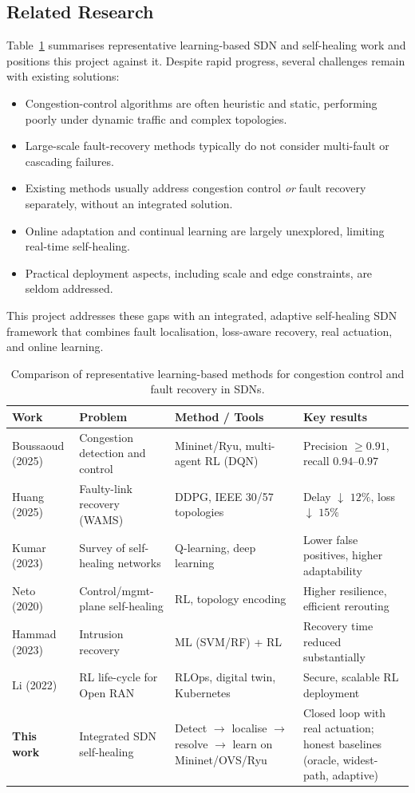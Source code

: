 \documentclass[12pt,a4paper]{report}
\begin{document}
\subsection{Related Research}
Table~\ref{tab:related} summarises representative learning-based SDN and self-healing work
and positions this project against it. Despite rapid progress, several challenges remain
with existing solutions:
\begin{itemize}
\item Congestion-control algorithms are often heuristic and static, performing poorly under
dynamic traffic and complex topologies.
\item Large-scale fault-recovery methods typically do not consider multi-fault or cascading
failures.
\item Existing methods usually address congestion control \emph{or} fault recovery
separately, without an integrated solution.
\item Online adaptation and continual learning are largely unexplored, limiting real-time
self-healing.
\item Practical deployment aspects, including scale and edge constraints, are seldom
addressed.
\end{itemize}
This project addresses these gaps with an integrated, adaptive self-healing SDN framework
that combines fault localisation, loss-aware recovery, real actuation, and online learning.

\begin{table}[t]
\centering
\footnotesize
\caption{Comparison of representative learning-based methods for congestion control and
fault recovery in SDNs.}
\label{tab:related}
\begin{tabular}{@{}p{2.3cm}p{3.2cm}p{3.0cm}p{3.4cm}@{}}
\toprule
\textbf{Work} & \textbf{Problem} & \textbf{Method / Tools} & \textbf{Key results} \\
\midrule
Boussaoud (2025) & Congestion detection and control & Mininet/Ryu, multi-agent RL (DQN) &
Precision $\ge0.91$, recall $0.94$--$0.97$ \\
Huang (2025) & Faulty-link recovery (WAMS) & DDPG, IEEE 30/57 topologies & Delay $\downarrow$
$12\%$, loss $\downarrow$ $15\%$ \\
Kumar (2023) & Survey of self-healing networks & Q-learning, deep learning & Lower false
positives, higher adaptability \\
Neto (2020) & Control/mgmt-plane self-healing & RL, topology encoding & Higher resilience,
efficient rerouting \\
Hammad (2023) & Intrusion recovery & ML (SVM/RF) + RL & Recovery time reduced substantially \\
Li (2022) & RL life-cycle for Open RAN & RLOps, digital twin, Kubernetes & Secure, scalable
RL deployment \\
\textbf{This work} & Integrated SDN self-healing & Detect $\rightarrow$ localise
$\rightarrow$ resolve $\rightarrow$ learn on Mininet/OVS/Ryu & Closed loop with real
actuation; honest baselines (oracle, widest-path, adaptive) \\
\bottomrule
\end{tabular}
\end{table}
\end{document}
